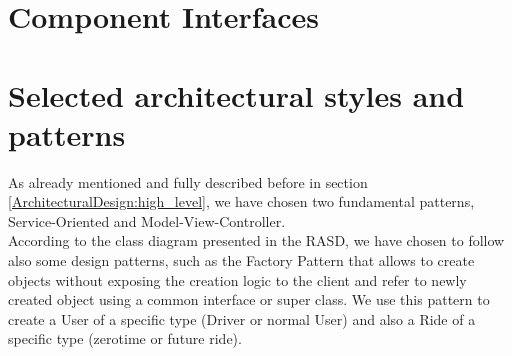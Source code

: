 \documentclass[\mainpath/main]{subfiles}
\begin{document}

\section{Component Interfaces}
\label{ArchitecturalDesign:comp_interfaces} 


\section{Selected architectural styles and patterns}
\label{ArchitecturalDesign:design_patterns}
As already mentioned and fully described before in section \ref{ArchitecturalDesign:high_level}, we have chosen two fundamental patterns, Service-Oriented and Model-View-Controller.\\
According to the class diagram presented in the RASD, we have chosen to follow also some design patterns, such as the Factory Pattern that allows to create objects without exposing the creation logic to the client and refer to newly created object using a common interface or super class. We use this pattern to create a User of a specific type (Driver or normal User) and also a Ride of a specific type (zerotime or future ride).


\end{document}
